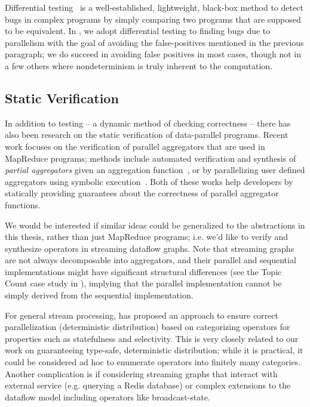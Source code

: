 Differential testing~\cite{mckeeman1998differential,groce2007randomized} is a well-established, lightweight, black-box method to detect bugs in complex programs by simply comparing two programs that are supposed to be equivalent.
In , we adopt differential testing to finding bugs due to parallelism with the goal of avoiding the false-positives mentioned in the previous paragraph; we do succeed in avoiding false positives in most cases, though not in a few others where nondeterminism is truly inherent to the computation.

\subsection{Static Verification}

In addition to testing -- a dynamic method of checking
correctness -- there has also been research on the static verification
of data-parallel programs. Recent work focuses on the verification of
parallel aggregators that are used in MapReduce programs; methods include automated verification and synthesis of \emph{partial
aggregators} given an aggregation function~\cite{liu2014automating},
or by parallelizing user defined aggregators using symbolic
execution~\cite{raychev2015parallelizing}. Both of these works help
developers by statically providing guarantees about the correctness of
parallel aggregator functions.

We would be interested if similar ideas could be generalized to the abstractions in this thesis,
rather than just MapReduce programs;
i.e. we'd like to verify and synthesize operators in streaming dataflow graphs.
Note that streaming graphs are not always decomposable into aggregators, and their parallel
and sequential implementations might have significant structural
differences (see the Topic Count case study in
), implying that the parallel implementation cannot be simply
derived from the sequential implementation.

For general stream processing, \cite{schneider2013safe} has proposed an approach to ensure correct parallelization (deterministic distribution) based on categorizing operators for properties such as statefulness and selectivity.
This is very closely related to our work on guaranteeing type-safe, deterministic distribution;
while it is practical, it could be considered ad hoc to enumerate operators into finitely many categories.
Another complication is if considering streaming graphs that interact with external service (e.g. querying a Redis database) or complex extensions to the dataflow model including operators like broadcast-state.

